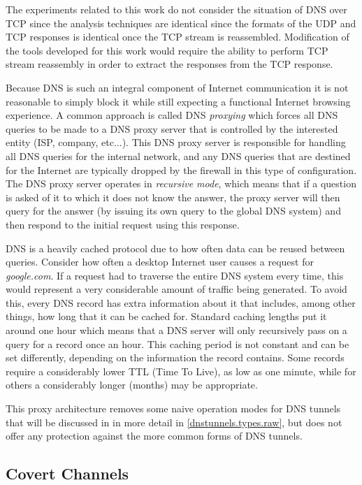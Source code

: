 \documentclass{article}
\theoremstyle{remark}
\theoremstyle{definition}
\theoremstyle{definition}
\theoremstyle{definition}
\begin{document}
The experiments related to this work do not consider the situation of DNS over
TCP since the analysis techniques are identical since the formats of the UDP
and TCP responses is identical once the TCP stream is reassembled. Modification
of the tools developed for this work would require the ability to perform TCP
stream reassembly in order to extract the responses from the TCP response.

Because DNS is such an integral component of Internet communication it is not
reasonable to simply block it while still expecting a functional Internet
browsing experience. A common approach is called DNS \emph{proxying} which
forces all DNS queries to be made to a DNS proxy server that is controlled by
the interested entity (ISP, company, etc...). This DNS proxy server is
responsible for handling all DNS queries for the internal network, and any DNS
queries that are destined for the Internet are typically dropped by the
firewall in this type of configuration. The DNS proxy server operates in
\emph{recursive mode}, which means that if a question is asked of it to which
it does not know the answer, the proxy server will then query for the answer (by
issuing its own query to the global DNS system) and then respond to the initial
request using this response.

DNS is a heavily cached protocol due to how often data can be reused between queries. Consider how often a desktop Internet user causes a request for
\emph{google.com}. If a request had to traverse the entire DNS system every
time, this would represent a very considerable amount of traffic being
generated. To avoid this, every DNS record has extra information about it that
includes, among other things, how long that it can be cached for. Standard
caching lengths put it around one hour which means that a DNS server will only
recursively pass on a query for a record once an hour. This caching period is
not constant and can be set differently, depending on the information the
record contains. Some records require a considerably lower TTL (Time To Live),
as low as one minute, while for others a considerably longer (months) may be
appropriate.

This proxy architecture removes some naive operation modes for DNS tunnels
that will be discussed in in more detail in \ref{dnstunnels.types.raw}, but does
not offer any protection against the more common forms of DNS tunnels.

\subsection{Covert Channels}
\end{document}
